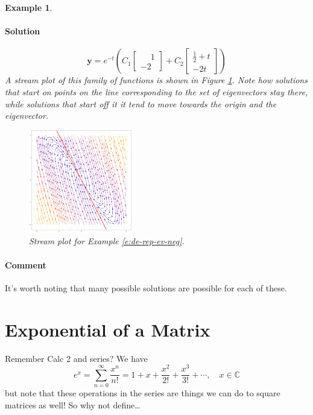 \documentclass[letterpaper, 11pt, openany]{book}
\theoremstyle{mytheoremstyle}
\theoremstyle{myexamplestyle}
\newtheorem{example}{Example}[section]
\newenvironment{solution}{\paragraph{\sffamily \smaller \fontseries{b}\selectfont Solution}}{\hfill\faSquare}
\newenvironment{commentary}{\paragraph{\sffamily \smaller \fontseries{b}\selectfont Comment}}{}
\begin{document}
\begin{example}
\begin{solution}
        \[\mathbf{y} = e^{-t}\left(C_{1}\begin{bmatrix}\phantom{-}1 \\ -2\end{bmatrix} + C_{2}\begin{bmatrix}\frac{1}{2} + t\\-2t\end{bmatrix} \right)\]
        A stream plot of this family of functions is shown in Figure \ref{f:de-rep-ev-neg}. Note how solutions that start on points on the line corresponding to the set of eigenvectors stay there, while solutions that start off it it tend to move towards the origin and the eigenvector.
        \begin{figure}[htbp]
            \centering
                \includegraphics[width=0.4\textwidth]{Figures/de-rep-ev-neg.pdf}
            \caption{Stream plot for Example \ref{e:de-rep-ev-neg}.}
            \label{f:de-rep-ev-neg}
        \end{figure}
    \end{solution}
\end{example}

\begin{commentary}
    It's worth noting that many possible solutions are possible for each of these.
\end{commentary}

\section{Exponential of a Matrix}
\setcounter{figure}{0}
Remember Calc 2 and series? We have
\[e^{x} = \sum_{n=0}^{\infty} \frac{x^{n}}{n!} = 1 + x + \frac{x^{2}}{2!} + \frac{x^{3}}{3!} + \cdots, \quad x \in \mathbb{C}\]
but note that these operations in the series are things we can do to square matrices as well! So why not define\dots
\end{document}
